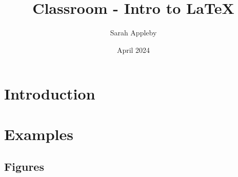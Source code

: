 \documentclass[a4paper, 12pt]{article}
\title{Classroom - Intro to LaTeX}
\author{Sarah Appleby}
\date{April 2024}
\begin{document}
\maketitle

\tableofcontents 

\section{Introduction}









\section{Examples}


\subsection{Figures}
\end{document}

